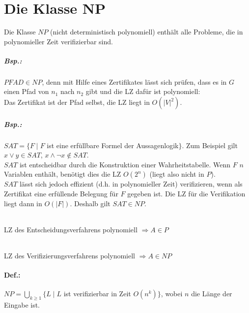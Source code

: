 \documentclass{scrreprt}
\begin{document}
\section{Die Klasse NP}
Die Klasse $NP$ (nicht deterministisch polynomiell) enthält alle Probleme, die in polynomieller Zeit verifizierbar sind.
\subparagraph{Bsp.:} $PFAD \in NP$, denn mit Hilfe eines Zertifikates lässt sich prüfen, dass es in $G$ einen Pfad von $n_1$ nach $n_2$ gibt und die LZ dafür ist polynomiell:\\
Das Zertifikat ist der Pfad selbst, die LZ liegt in $O(|V|^2)$.
\subparagraph{Bsp.:} $SAT=\{F\;|\;F$ ist eine erfüllbare Formel der Aussagenlogik$\}$. Zum Beispiel gilt $x\vee y \in SAT$, $x\wedge \neg x \not \in SAT$.\\
$SAT$ ist entscheidbar durch die Konstruktion einer Wahrheitstabelle. Wenn $F$ $n$ Variablen enthält, benötigt dies die LZ $O(2^n)$ (liegt also nicht in $P$).\\
$SAT$ lässt sich jedoch effizient (d.h. in polynomieller Zeit) verifizieren, wenn als Zertifikat eine erfüllende Belegung für $F$ gegeben ist. Die LZ für die Verifikation liegt dann in $O(|F|)$. Deshalb gilt $SAT \in NP$.\\
\\
LZ des Entscheidungsverfahrens polynomiell $\Rightarrow A \in P$ \\
\\
LZ des Verifizierungsverfahrens polynomiell $\Rightarrow A \in NP$
\paragraph{Def.:} $NP = \bigcup_{k\geq 1}\{L\;|\; L$ ist verifizierbar in Zeit $O(n^k)\}$, wobei $n$ die Länge der Eingabe ist.
\end{document}
